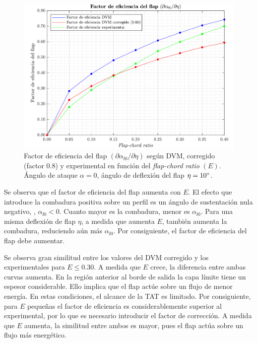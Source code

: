 \begin{figure}[ht] 
    \centering
    \includegraphics[width=\linewidth]{imagenes/validacion/validacion_flap.pdf}
    \caption{Factor de eficiencia del flap $\left( \partial \alpha_{l0} / \partial \eta \right)$ según DVM, corregido (factor $0.8$) y experimental en función del \emph{flap-chord ratio} $\left( E \right)$. Ángulo de ataque $\alpha = 0$, ángulo de deflexión del flap $\eta = 10\mathrm{^{\circ}}$.}
    \label{fig:validacion_flap}
\end{figure}

Se observa que el factor de eficiencia del flap aumenta con $E$. El efecto que introduce la combadura positiva sobre un perfil es un ángulo de sustentación nula negativo, \ie, $\alpha_{l0} < 0$. Cuanto mayor es la combadura, menor es $\alpha_{l0}$. Para una misma deflexión de flap $\eta$, a medida que aumenta $E$, también aumenta la combadura, reduciendo aún más $\alpha_{l0}$. Por consiguiente, el factor de eficiencia del flap debe aumentar.

Se observa gran similitud entre los valores del DVM corregido y los experimentales para $E \leq 0.30$. A medida que $E$ crece, la diferencia entre ambas curvas aumenta. En la región anterior al borde de salida la capa límite tiene un espesor considerable. Ello implica que el flap actúe sobre un flujo de menor energía. En estas condiciones, el alcance de la TAT es limitado. Por consiguiente, para $E$ pequeñas el factor de eficiencia es considerablemente superior al experimental, por lo que es necesario introducir el factor de corrección. A medida que $E$ aumenta, la similitud entre ambos es mayor, pues el flap actúa sobre un flujo más energético.


